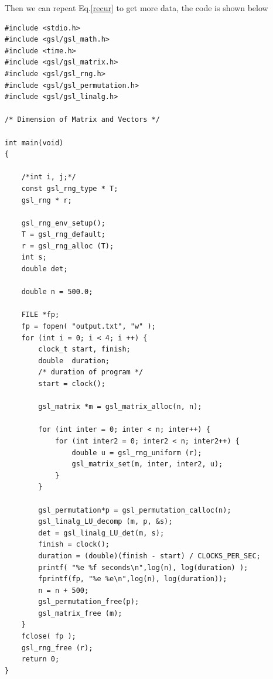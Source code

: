 \documentclass{article}
\begin{document}
Then we can repeat Eq.\ref{recur} to get more data, the code is shown below
\begin{lstlisting}
#include <stdio.h>
#include <gsl/gsl_math.h>
#include <time.h>
#include <gsl/gsl_matrix.h>
#include <gsl/gsl_rng.h>
#include <gsl/gsl_permutation.h>
#include <gsl/gsl_linalg.h>

/* Dimension of Matrix and Vectors */

int main(void)
{
    
    /*int i, j;*/
    const gsl_rng_type * T;
    gsl_rng * r;
    
    gsl_rng_env_setup();
    T = gsl_rng_default;
    r = gsl_rng_alloc (T);
    int s;
    double det;
 
    double n = 500.0;
    
    FILE *fp;
    fp = fopen( "output.txt", "w" );
    for (int i = 0; i < 4; i ++) {
        clock_t start, finish;
        double  duration;
        /* duration of program */
        start = clock();
        
        gsl_matrix *m = gsl_matrix_alloc(n, n);
        
        for (int inter = 0; inter < n; inter++) {
            for (int inter2 = 0; inter2 < n; inter2++) {
                double u = gsl_rng_uniform (r);
                gsl_matrix_set(m, inter, inter2, u);
            }
        }
        
        gsl_permutation*p = gsl_permutation_calloc(n);
        gsl_linalg_LU_decomp (m, p, &s);
        det = gsl_linalg_LU_det(m, s);
        finish = clock();
        duration = (double)(finish - start) / CLOCKS_PER_SEC;
        printf( "%e %f seconds\n",log(n), log(duration) );
        fprintf(fp, "%e %e\n",log(n), log(duration));
        n = n + 500;
        gsl_permutation_free(p);
        gsl_matrix_free (m);
    }
    fclose( fp );
    gsl_rng_free (r);
    return 0;
}
\end{lstlisting} 
\end{document}
